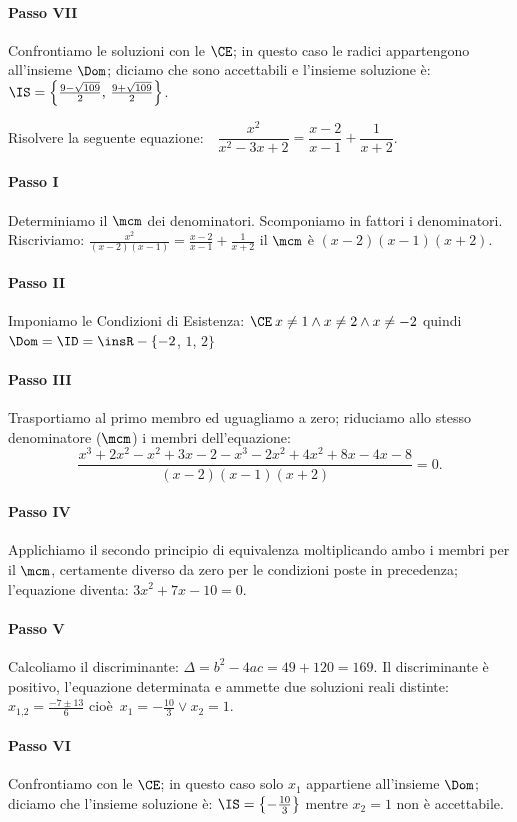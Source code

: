 \begin{exrig}
\begin{esempio}
 \paragraph{Passo VII} Confrontiamo le soluzioni con le $\CE$; in questo caso le radici appartengono all'insieme $\Dom$; diciamo che sono accettabili e l'insieme soluzione è: $\IS=\left\{\frac{9 - \sqrt{109}}{2}\text{, }\frac{9 +\sqrt{109}}{2} \right\}$.
 \end{esempio}

 \begin{esempio}
Risolvere la seguente equazione:~~$\dfrac{x^{2}}{x^{2} - 3 x + 2}=\dfrac{x - 2}{x - 1} +\dfrac{1}{x + 2}$.
 \paragraph{Passo I} Determiniamo il $\mcm$ dei denominatori. Scomponiamo in fattori i denominatori. Riscriviamo: $\frac{x^{2}}{( x - 2 ) ( x - 1 )}=\frac{x - 2}{x - 1} +\frac{1}{x + 2}$ il $\mcm$ è $( x - 2 ) ( x - 1 ) ( x + 2 )$.
 \paragraph{Passo II} Imponiamo le Condizioni di Esistenza: $\CE\: x \neq 1 \wedge x \neq 2 \wedge x \neq - 2$ quindi $\Dom = \ID =\insR - \{-2$, $1$, $2\}$
 \paragraph{Passo III} Trasportiamo al primo membro ed uguagliamo a zero; riduciamo allo stesso denominatore ($\mcm$) i membri dell'equazione: 
\[\frac{x^{3} + 2 x^{2} - x^{2} + 3 x - 2 - x^{3} - 2 x^{2} + 4x^{2} + 8 x - 4 x - 8}{( x - 2 ) ( x - 1 ) ( x + 2 )} = 0.\]
 \paragraph{Passo IV} Applichiamo il secondo principio di equivalenza moltiplicando ambo i membri per il $\mcm$, certamente diverso da zero per le condizioni poste in precedenza; l'equazione diventa: $3 x^{2} + 7 x - 10 = 0$.
 \paragraph{Passo V} Calcoliamo il discriminante: $\Delta=b^{2} - 4 a c=49 + 120=169$. Il discriminante è positivo, l'equazione determinata e ammette due soluzioni reali distinte: $x_{1\text{,}2}=\frac{- 7 \pm 13}{6}$ cioè~$x_{1}=-\frac{10}{3} \vee x_{2}=1$.
 \paragraph{Passo VI} Confrontiamo con le $\CE$; in questo caso solo $x_{1}$ appartiene all'insieme $\Dom$; diciamo che l'insieme soluzione è: $\IS=\left\{-\frac{10}{3}\right\}$ mentre $x_{2} = 1$ non è accettabile.
\end{esempio}
\end{exrig}
